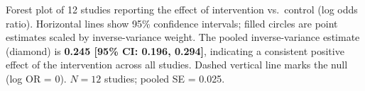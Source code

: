 \caption{Forest plot of 12 studies reporting the effect of intervention vs.\ control (log odds ratio). Horizontal lines show 95\% confidence intervals; filled circles are point estimates scaled by inverse-variance weight. The pooled inverse-variance estimate (diamond) is \textbf{0.245 [95\% CI: 0.196, 0.294]}, indicating a consistent positive effect of the intervention across all studies. Dashed vertical line marks the null (log OR = 0). $N = 12$ studies; pooled SE = 0.025.}
